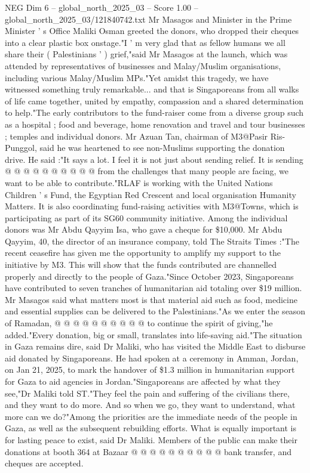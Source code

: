 \begin{textsample}{NEG Dim 6 – global\_north\_2025\_03 – Score 1.00 – global\_north\_2025\_03/121840742.txt}  \label{ex:f6_neg_170}
Mr Masagos and Minister in the Prime Minister ' s Office Maliki Osman greeted the donors, who dropped their cheques into a clear plastic box onstage."I ' m very glad that as fellow humans we all share their ( Palestinians ' ) grief,"said Mr Masagos at the launch, which was attended by representatives of businesses and Malay/Muslim organisations, including various Malay/Muslim MPs."Yet amidst this tragedy, we have witnessed something truly remarkable... and that is Singaporeans from all walks of life came together, united by empathy, compassion and a shared determination to help."The early contributors to the fund-raiser come from a diverse group such as a hospital ; food and beverage, home renovation and travel and tour businesses ; temples and individual donors.
Mr Azuan Tan, chairman of M3@Pasir Ris-Punggol, said he was heartened to see non-Muslims supporting the donation drive.
He said :"It says a lot.
I feel it is not just about sending relief.
It is sending @ @ @ @ @ @ @ @ @ @ from the challenges that many people are facing, we want to be able to contribute."RLAF is working with the United Nations Children ' s Fund, the Egyptian Red Crescent and local organisation Humanity Matters.
It is also coordinating fund-raising activities with M3@Towns, which is participating as part of its SG60 community initiative.
Among the individual donors was Mr Abdu Qayyim Isa, who gave a cheque for \$10,000.
Mr Abdu Qayyim, 40, the director of an insurance company, told The Straits Times :"The recent ceasefire has given me the opportunity to amplify my support to the initiative by M3.
This will show that the funds contributed are channelled properly and directly to the people of Gaza."Since October 2023, Singaporeans have contributed to seven tranches of humanitarian aid totaling over \$19 million.
Mr Masagos said what matters most is that material aid such as food, medicine and essential supplies can be delivered to the Palestinians."As we enter the season of Ramadan, @ @ @ @ @ @ @ @ @ @ to continue the spirit of giving,"he added."Every donation, big or small, translates into life-saving aid."The situation in Gaza remains dire, said Dr Maliki, who has visited the Middle East to disburse aid donated by Singaporeans.
He had spoken at a ceremony in Amman, Jordan, on Jan 21, 2025, to mark the handover of \$1.3 million in humanitarian support for Gaza to aid agencies in Jordan."Singaporeans are affected by what they see,"Dr Maliki told ST."They feel the pain and suffering of the civilians there, and they want to do more.
And so when we go, they want to understand, what more can we do?"Among the priorities are the immediate needs of the people in Gaza, as well as the subsequent rebuilding efforts.
What is equally important is for lasting peace to exist, said Dr Maliki.
Members of the public can make their donations at booth 364 at Bazaar @ @ @ @ @ @ @ @ @ @ bank transfer, and cheques are accepted.

\end{textsample}
